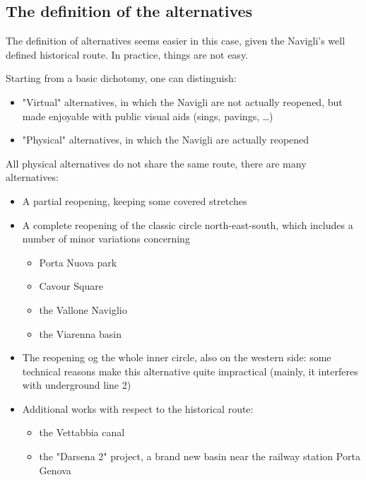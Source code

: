 \subsection{The definition of the alternatives}
\label{subsec:navialternatives}

The definition of alternatives seems easier in this case, given the Navigli's well defined historical route. In practice, things are not easy.

Starting from a basic dichotomy, one can distinguish: 
\begin{itemize}
	\item "Virtual" alternatives, in which the Navigli are not actually reopened, but made enjoyable with public visual aids (sings, pavings, \dots)
	
	\item "Physical" alternatives, in which the Navigli are actually reopened
\end{itemize}

All physical alternatives do not share the same route, there are many alternatives: 
\begin{itemize}
	\item A partial reopening, keeping some covered stretches
	
	\item A complete reopening of the classic circle north-east-south, which includes a number of minor variations concerning
	\begin{itemize}
		\item Porta Nuova park
		
		\item Cavour Square
		
		\item the Vallone Naviglio
		
		\item the Viarenna basin
	\end{itemize}
	
	\item The reopening og the whole inner circle, also on the western side: some technical reasons make this alternative quite impractical (mainly, it interferes with underground line 2)
	
	\item Additional works with respect to the historical route:
	\begin{itemize}
		\item the Vettabbia canal
		
		\item the "Darsena 2" project, a brand new basin near the railway station Porta Genova
	\end{itemize}
\end{itemize}

